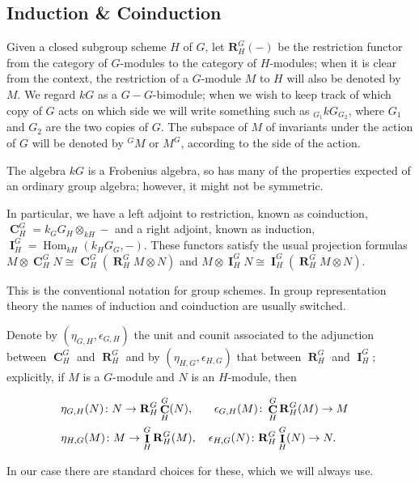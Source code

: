 \documentclass[12pt]{amsart}
\theoremstyle{definition}
\DeclareMathOperator{\ind}{\mathbf{I}}
\DeclareMathOperator{\coind}{\mathbf{C}}
\DeclareMathOperator{\res}{\mathbf{R}}
\DeclareMathOperator{\Hom}{Hom}
\begin{document}
\subsection{Induction \& Coinduction}\label{sec:ind}
Given a closed subgroup scheme $H$ of $G$, let $\mathbf{R}_H^G(-)$ be the restriction functor  from the category of $G$-modules to the category of $H$-modules; when it is clear from the context, the restriction of a $G$-module $M$ to $H$ will also be denoted by $M$. We regard $kG$ as a $G{-}G$-bimodule; when we wish to keep track of which copy of $G$ acts on which side we will write something such as ${}_{G_1}kG_{G_2}$, where $G_1$ and $G_2$ are the two copies of $G$. The subspace of $M$ of invariants under the action of $G$ will be denoted by ${}^GM$ or $M^G$, according to the side of the action. 

The algebra $kG$ is a Frobenius algebra, so has many of the properties expected of an ordinary group algebra; however, it might not be symmetric.

In particular, we have a left adjoint to restriction, known as coinduction, $\coind_H^G=k{}_GG_H\otimes_{kH} -$ and a right adjoint, known as induction, $\ind^G_H = \Hom_{kH}(k{}_HG_G,-)$. These functors satisfy the usual projection formulas $M \otimes \coind^G_H N \cong \coind^G_H (\res^G_H M \otimes N)$ and $M \otimes \ind^G_H N \cong \ind^G_H (\res^G_H M \otimes N)$.


This is the conventional notation for group schemes. In group representation theory the names of induction and coinduction are usually switched. 



Denote by $(\eta_{G,H},\epsilon_{G,H})$ the unit and counit associated to the adjunction between $\coind_H^G$ and $\res_H^G$ and by $(\eta_{H,G},\epsilon_{H,G})$ that between $\res_H^G$ and $\ind_H^G$; explicitly, if $M$ is a $G$-module and $N$ is an $H$-module, then

\begin{align}\label{eq:unit-counit}
 &\eta_{G,H}(N) \colon N\rightarrow {\bf R}_H^G\coind_H^G(N),
\quad \;\;\; \epsilon_{G,H}(M) \colon \coind_H^G{\bf R}_H^G (M)\rightarrow M&
 \\ \nonumber
 &\eta_{H,G}(M) \colon M \rightarrow \ind_H^G{\bf R}_H^G(M),
\quad \epsilon_{H,G}(N) \colon {\bf R}_H^G \ind_H^G(N)\rightarrow N .&
\end{align}

In our case there are standard choices for these, which we will always use.
\end{document}

